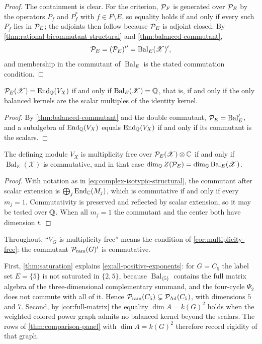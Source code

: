 \begin{proof}
The containment is clear.  For the criterion, \(\mathcal P_F\) is generated
over \(\mathcal P_E\) by the operators \(P_f\) and \(P_f^*\) with \(f\in
F\setminus E\), so equality holds if and only if every such \(P_f\) lies in
\(\mathcal P_E\); the adjoints then follow because \(\mathcal P_E\) is adjoint closed.  By
\cref{thm:rational-bicommutant-structural} and
\cref{thm:balanced-commutant},
\[
 \mathcal P_E=(\mathcal P_E)''=\operatorname{Bal}_E(\mathscr X)',
\]
and membership in the commutant of \(\operatorname{Bal}_E\) is the
stated commutation condition.
\end{proof}

\begin{corollary}
\label{cor:full-matrix}
\(\mathcal P_E(\mathscr X)=\operatorname{End}_\mathbb Q(V_X)\) if and only if
\(\operatorname{Bal}_E(\mathscr X)=\mathbb Q\), that is, if and only if the only
balanced kernels are the scalar multiples of the identity kernel.
\end{corollary}

\begin{proof}
By \cref{thm:balanced-commutant} and the double commutant,
\(\mathcal P_E=\operatorname{Bal}_E'\), and a subalgebra of \(\operatorname{End}_\mathbb Q(V_X)\) equals
\(\operatorname{End}_\mathbb Q(V_X)\) if and only if its commutant is the scalars.
\end{proof}

\begin{corollary}
\label{cor:multiplicity-free}
The defining module \(V_X\) is multiplicity free over
\(\mathcal P_E(\mathscr X)\otimes\mathbb C\) if and only if \(\operatorname{Bal}_E(\mathscr X)\) is
commutative, and in that case
\(\dim_\mathbb Q Z(\mathcal P_E)=\dim_\mathbb Q\operatorname{Bal}_E(\mathscr X)\).
\end{corollary}

\begin{proof}
With notation as in \eqref{eq:complex-isotypic-structural}, the commutant
after scalar extension is \(\bigoplus_j\operatorname{End}_\mathbb C(M_j)\), which is commutative
if and only if every \(m_j=1\).  Commutativity is preserved and reflected by
scalar extension, so it may be tested over \(\mathbb Q\).  When all \(m_j=1\) the
commutant and the center both have dimension \(t\).
\end{proof}

Throughout, ``\(V_G\) is multiplicity free'' means the condition of
\cref{cor:multiplicity-free}: the commutant \(\mathcal P_{\mathrm{ram}}(G)'\) is commutative.

First, \cref{thm:saturation} explains \cref{ex:all-positive-exponents}: for
\(G=C_5\) the label set \(E=\{5\}\) is not saturated in \(\{2,5\}\), because
\(\operatorname{Bal}_{\{5\}}\) contains the full matrix algebra of the
three-dimensional complementary summand, and the four-cycle \(\Psi_2\) does
not commute with all of it.  Hence
\(\mathcal P_{\mathrm{ram}}(C_5)\subsetneq\mathcal P_{\mathrm{Ad}}(C_5)\), with dimensions \(5\) and \(7\).
Second, by \cref{cor:full-matrix} the equality \(\dim A=k(G)^2\) holds when
the weighted colored power graph admits no balanced kernel beyond
the scalars.  The rows of \cref{thm:comparison-panel} with
\(\dim A=k(G)^2\) therefore record rigidity of that graph.
